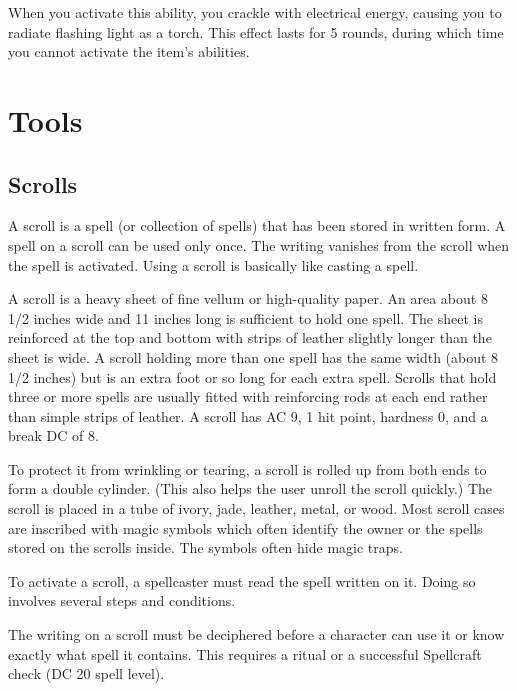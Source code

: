When you activate this ability, you crackle with electrical energy, causing you to radiate flashing light as a torch.
This effect lasts for 5 rounds, during which time you cannot activate the item's abilities.


\section{Tools}

\subsection{Scrolls}
A scroll is a spell (or collection of spells) that has been stored in written form.
A spell on a scroll can be used only once.
The writing vanishes from the scroll when the spell is activated.
Using a scroll is basically like casting a spell.

 A scroll is a heavy sheet of fine vellum or high-quality paper.
An area about 8 1/2 inches wide and 11 inches long is sufficient to hold one spell.
The sheet is reinforced at the top and bottom with strips of leather slightly longer than the sheet is wide.
A scroll holding more than one spell has the same width (about 8 1/2 inches) but is an extra foot or so long for each extra spell.
Scrolls that hold three or more spells are usually fitted with reinforcing rods at each end rather than simple strips of leather.
A scroll has AC 9, 1 hit point, hardness 0, and a break DC of 8.

To protect it from wrinkling or tearing, a scroll is rolled up from both ends to form a double cylinder.
(This also helps the user unroll the scroll quickly.) The scroll is placed in a tube of ivory, jade, leather, metal, or wood.
Most scroll cases are inscribed with magic symbols which often identify the owner or the spells stored on the scrolls inside.
The symbols often hide magic traps.

 To activate a scroll, a spellcaster must read the spell written on it.
Doing so involves several steps and conditions.

 The writing on a scroll must be deciphered before a character can use it or know exactly what spell it contains.
This requires a  ritual or a successful Spellcraft check (DC 20 \add spell level).

